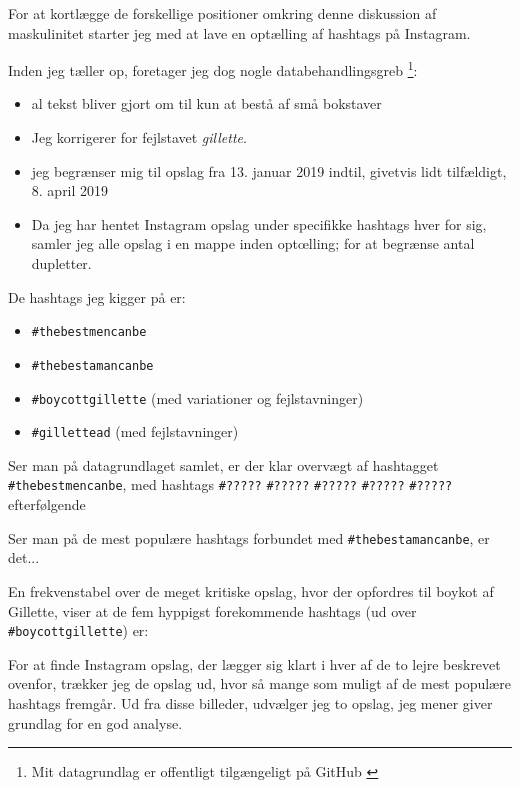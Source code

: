 For at kortlægge de forskellige positioner omkring denne 
diskussion af maskulinitet starter jeg med at lave en optælling af 
hashtags på Instagram.

Inden jeg tæller op, foretager jeg dog nogle databehandlingsgreb 
\footnote{Mit datagrundlag er offentligt tilgængeligt på GitHub 
\autocite{andersenEksamensopgaveSocialiseringOg2019}}:
\begin{itemize}
    \item
        al tekst bliver gjort om til kun at bestå af små bokstaver
    \item
        Jeg korrigerer for fejlstavet \textit{gillette}.
    \item
        jeg begrænser mig til opslag fra 13. januar 2019 indtil, 
        givetvis lidt tilfældigt, 8. april 2019
    \item
        Da jeg har hentet Instagram opslag under specifikke 
        hashtags hver for sig, samler jeg alle opslag i en mappe 
        inden optœlling; for at begrænse antal dupletter.
\end{itemize}

De hashtags jeg kigger på er:
\begin{itemize}
    \item
        \texttt{\#thebestmencanbe}
    \item
        \texttt{\#thebestamancanbe}
    \item
        \texttt{\#boycottgillette} (med variationer og 
        fejlstavninger)
    \item
        \texttt{\#gillettead} (med fejlstavninger)
\end{itemize}

Ser man på datagrundlaget samlet, er der klar overvægt af 
hashtagget \texttt{\#thebestmencanbe}, med hashtags
\texttt{\#?????} \texttt{\#?????} \texttt{\#?????}
\texttt{\#?????} \texttt{\#?????} efterfølgende

Ser man på de mest populære
hashtags forbundet med \texttt{\#thebestamancanbe}, er det...

En frekvenstabel over de meget kritiske opslag, hvor der opfordres 
til boykot af Gillette, viser at de fem hyppigst forekommende 
hashtags (ud over \texttt{\#boycottgillette}) er:

For at finde Instagram opslag, der lægger sig klart i hver af de 
to lejre beskrevet ovenfor, trækker jeg de opslag ud, hvor så 
mange som muligt af de mest populære hashtags fremgår. Ud fra 
disse billeder, udvælger jeg to opslag, jeg mener giver grundlag 
for en god analyse.

